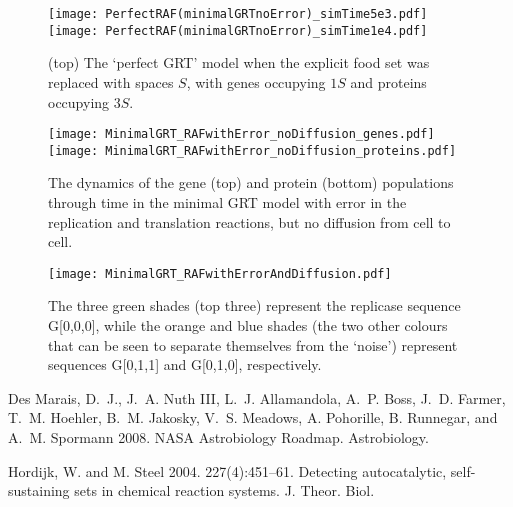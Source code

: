 \documentclass{article}
\begin{document}
{\begin{figure}
    \centering
    	\quad
    	\texttt{[image: PerfectRAF(minimalGRTnoError)\_simTime5e3.pdf]}
    	\quad
    	\texttt{[image: PerfectRAF(minimalGRTnoError)\_simTime1e4.pdf]}
    \caption{(top) The `perfect GRT' model when the explicit food set was replaced with spaces $S$, with genes occupying $1S$ and proteins occupying $3S$.}
	\label{fig:spaceAsFood}
\end{figure}

\begin{figure}
    \centering
    	\quad
    	\texttt{[image: MinimalGRT\_RAFwithError\_noDiffusion\_genes.pdf]}
    	\quad
    	\texttt{[image: MinimalGRT\_RAFwithError\_noDiffusion\_proteins.pdf]}
    \caption{The dynamics of the gene (top) and protein (bottom) populations through time in the minimal GRT model with error in the replication and translation reactions, but no diffusion from cell to cell.}
	\label{fig:minGRTnoDiffusion}
\end{figure}

\begin{figure}
    \centering
    	\texttt{[image: MinimalGRT\_RAFwithErrorAndDiffusion.pdf]}
    \caption{The three green shades (top three) represent the replicase sequence G[0,0,0], while the orange and blue shades (the two other colours that can be seen 
    to separate themselves from the `noise') represent sequences G[0,1,1] and G[0,1,0], respectively.}
	\label{fig:minGRT}
\end{figure}


\newpage
\begin{thebibliography}{99} %

{\sc Des Marais, D.~J.}, {\sc J.~A. Nuth III}, {\sc L.~J. Allamandola}, 
{\sc A.~P. Boss}, {\sc J.~D. Farmer}, {\sc T.~M. Hoehler}, {\sc B.~M. Jakosky}, 
{\sc V.~S. Meadows}, {\sc A. Pohorille}, {\sc B. Runnegar}, and {\sc A.~M. Spormann} 2008.
NASA Astrobiology Roadmap.
\newblock Astrobiology.

{\sc Hordijk, W.} and {\sc M. Steel} 2004. 227(4):451–61.
Detecting autocatalytic, self-sustaining sets in chemical reaction systems.
\newblock J. Theor. Biol.


\end{thebibliography}}
\end{document}
